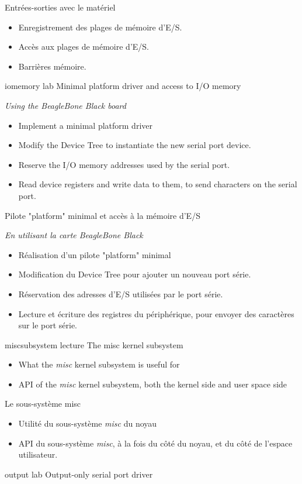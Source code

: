 {Entrées-sorties avec le matériel}
{
  \begin{itemize}
  \item Enregistrement des plages de mémoire d'E/S.
  \item Accès aux plages de mémoire d'E/S.
  \item Barrières mémoire.
  \end{itemize}
}
{iomemory}
{lab}
{Minimal platform driver and access to I/O memory}
{
  {\em Using the BeagleBone Black board}
  \begin{itemize}
  \item Implement a minimal platform driver
  \item Modify the Device Tree to instantiate the new serial port
    device.
  \item Reserve the I/O memory addresses used by the serial port.
  \item Read device registers and write data to them, to send
    characters on the serial port.
  \end{itemize}
}
{Pilote "platform" minimal et accès à la mémoire d'E/S}
{
  {\em En utilisant la carte BeagleBone Black}
  \begin{itemize}
  \item Réalisation d'un pilote "platform" minimal
  \item Modification du Device Tree pour ajouter un nouveau
    port série.
  \item Réservation des adresses d'E/S utilisées par le port série.
  \item Lecture et écriture des registres du périphérique, pour
    envoyer des caractères sur le port série.
  \end{itemize}
}
{miscsubsystem}
{lecture}
{The misc kernel subsystem}
{
  \begin{itemize}
  \item What the {\em misc} kernel subsystem is useful for
  \item API of the {\em misc} kernel subsystem, both the kernel side
    and user space side
  \end{itemize}
}
{Le sous-système misc}
{
  \begin{itemize}
  \item Utilité du sous-système {\em misc} du noyau
  \item API du sous-système {\em misc}, à la fois du côté du noyau, et
    du côté de l'espace utilisateur.
  \end{itemize}
}
{output}
{lab}
{Output-only serial port driver}
